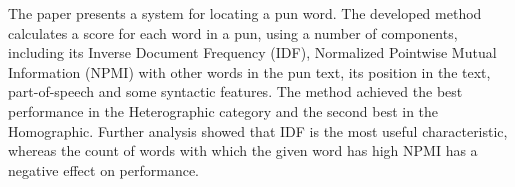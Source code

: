 The paper presents a system for locating a pun word. The developed method calculates a score for each word in a pun, using a number of components, including its Inverse Document Frequency (IDF), Normalized Pointwise Mutual Information (NPMI) with other words in the pun text, its position in the text, part-of-speech and some syntactic features. The method achieved the best performance in the Heterographic category and the second best in the Homographic. Further analysis showed that IDF is the most useful characteristic, whereas the count of words with which the given word has high NPMI has a negative effect on performance.
